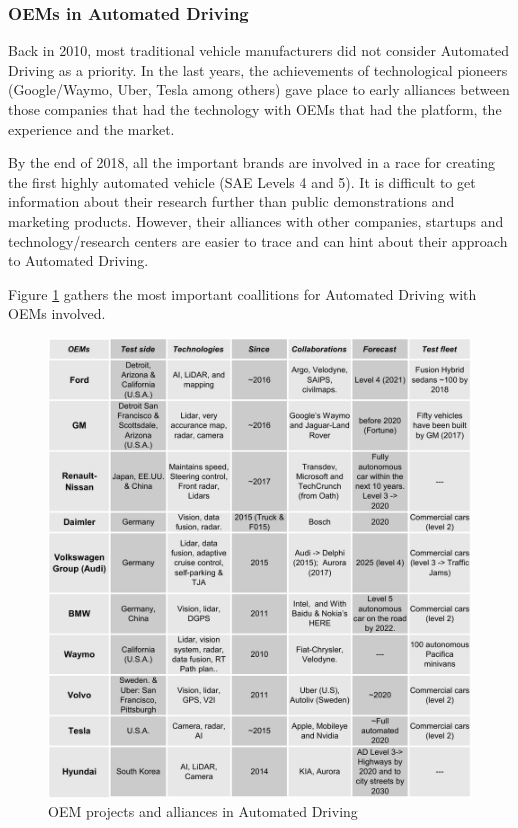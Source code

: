 \subsubsection{OEMs in Automated Driving}
\label{sec:oem-ad}

Back in 2010, most traditional vehicle manufacturers did not consider Automated
Driving as a priority. In the last years, the achievements of technological 
pioneers (Google/Waymo, Uber, Tesla among others) gave place to early alliances
between those companies that had the technology with OEMs that had the
platform, the experience and the market.

By the end of 2018, all the important brands are involved in a race for creating
the first highly automated vehicle (SAE Levels 4 and 5). It is difficult to
get information about their research further than public demonstrations and
marketing products. However, their alliances with other companies, startups
and technology/research centers are easier to trace and can hint about their 
approach to Automated Driving.

Figure \ref{fig:oem-ad} gathers the most important coallitions for Automated
Driving with OEMs involved.

\begin{figure}[p]
    \centering
    \includegraphics[width=1.00\textwidth]{"img/OEM_jp_trim"}
    \caption{OEM projects and alliances in Automated Driving}
    \label{fig:oem-ad}
\end{figure}

